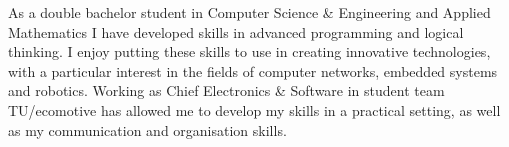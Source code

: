 \par{
    As a double bachelor student in Computer Science \& Engineering and Applied Mathematics I have developed skills in advanced programming and logical thinking. I enjoy putting these skills to use in creating innovative technologies, with a particular interest in the fields of computer networks, embedded systems and robotics. Working as Chief Electronics \& Software in student team TU/ecomotive has allowed me to develop my skills in a practical setting, as well as my communication and organisation skills.
}
